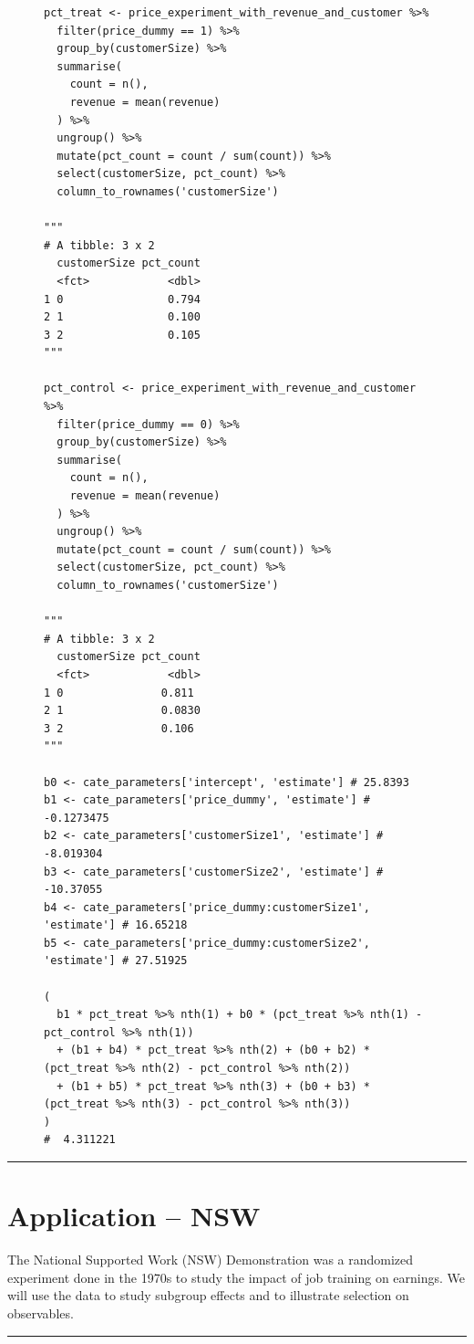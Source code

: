 \documentclass{article}
\newenvironment{colorparagraph}[1]{\par\color{#1}}{\par}
\begin{document}
\begin{figure}[H]
    \centering
\begin{lstlisting}[style=Rstyle, caption=Regression Based Plug-In Estimator Calculation]
pct_treat <- price_experiment_with_revenue_and_customer %>%
  filter(price_dummy == 1) %>% 
  group_by(customerSize) %>%
  summarise(
    count = n(),
    revenue = mean(revenue)
  ) %>% 
  ungroup() %>% 
  mutate(pct_count = count / sum(count)) %>% 
  select(customerSize, pct_count) %>% 
  column_to_rownames('customerSize')

"""
# A tibble: 3 x 2
  customerSize pct_count
  <fct>            <dbl>
1 0                0.794
2 1                0.100
3 2                0.105
"""

pct_control <- price_experiment_with_revenue_and_customer %>%
  filter(price_dummy == 0) %>% 
  group_by(customerSize) %>%
  summarise(
    count = n(),
    revenue = mean(revenue)
  ) %>% 
  ungroup() %>% 
  mutate(pct_count = count / sum(count)) %>% 
  select(customerSize, pct_count) %>% 
  column_to_rownames('customerSize')

"""
# A tibble: 3 x 2
  customerSize pct_count
  <fct>            <dbl>
1 0               0.811 
2 1               0.0830
3 2               0.106
"""

b0 <- cate_parameters['intercept', 'estimate'] # 25.8393
b1 <- cate_parameters['price_dummy', 'estimate'] # -0.1273475
b2 <- cate_parameters['customerSize1', 'estimate'] # -8.019304
b3 <- cate_parameters['customerSize2', 'estimate'] # -10.37055
b4 <- cate_parameters['price_dummy:customerSize1', 'estimate'] # 16.65218
b5 <- cate_parameters['price_dummy:customerSize2', 'estimate'] # 27.51925

(
  b1 * pct_treat %>% nth(1) + b0 * (pct_treat %>% nth(1) - pct_control %>% nth(1))
  + (b1 + b4) * pct_treat %>% nth(2) + (b0 + b2) * (pct_treat %>% nth(2) - pct_control %>% nth(2))
  + (b1 + b5) * pct_treat %>% nth(3) + (b0 + b3) * (pct_treat %>% nth(3) - pct_control %>% nth(3))
)
#  4.311221
\end{lstlisting}
\end{figure}

\newpage

\begin{colorparagraph}{questioncolor}
\rule{\textwidth}{0.5pt}

\label{q4}\section{Application -- NSW}

The National Supported Work (NSW) Demonstration was a randomized experiment done in the 1970s to study the impact of job training on earnings. We will use the data to study subgroup effects and to illustrate selection on observables.

\rule{\textwidth}{0.5pt}
\end{colorparagraph}
\end{document}
